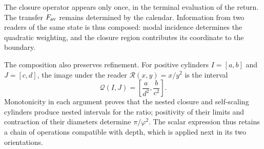 The closure operator appears only once, in the terminal evaluation
of the return. The transfer \(F_{\rm av}\) remains determined
by the calendar. Information from two readers of the same state is thus
composed: modal incidence determines the quadratic weighting,
and the closure region contributes its coordinate to the boundary.

The composition also preserves refinement. For positive cylinders
\(I=[a,b]\) and \(J=[c,d]\), the image under the reader
\(\mathcal R(x,y)=x/y^2\) is the interval
\[
 \mathcal Q(I,J)=\left[\frac{a}{d^2},\frac{b}{c^2}\right].
\]
Monotonicity in each argument proves that the nested closure
and self-scaling cylinders produce nested intervals for the ratio;
positivity of their limits and contraction of their diameters determine
\(\pi/\varphi^2\). The scalar expression thus retains a chain
of operations compatible with depth, which is applied
next in its two orientations.
